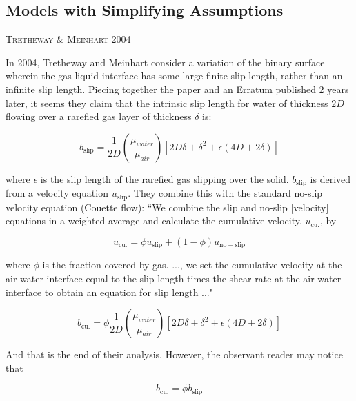 \documentclass[a4paper]{report}
\newcommand{\paper}[1]
         {\colorbox[gray]{0.8}{ \textsc{#1}}
         
         }
\begin{document}
\subsection*{Models with Simplifying Assumptions}

\paper{Tretheway \& Meinhart 2004}
In 2004, Tretheway and Meinhart \cite{TrethewayMeinhart2004} consider a variation of the binary surface wherein the gas-liquid interface has some large finite slip length, rather than an infinite slip length.  Piecing together the paper and an Erratum \cite{TrethewayMeinhartErratum2004} published 2 years later, it seems they claim that the intrinsic slip length for water of thickness $2D$ flowing over a rarefied gas layer of thickness $\delta$ is:

\begin{equation*}
b_{\mathrm{slip}} = \frac{1}{2D} \left( \frac{\mu_{water}}{\mu_{air}} \right)
\left[ 2D\delta + \delta^2 + \epsilon(4D + 2\delta) \right]
\end{equation*}

where $\epsilon$ is the slip length of the rarefied gas slipping over the solid.  $b_{\mathrm{slip}}$ is derived from a velocity equation $u_{\mathrm{slip}}$.  They combine this with the standard no-slip velocity equation (Couette flow):
``We combine the slip and no-slip [velocity] equations in a weighted average and calculate the cumulative velocity, $u_{\mathrm{cu.}}$, by

\begin{equation*}
u_{\mathrm{cu.}} = \phi u_{\mathrm{slip}} + (1-\phi) u_{\mathrm{no-slip}}
\end{equation*}

where $\phi$ is the fraction covered by gas. ..., we set the cumulative velocity at the air-water interface equal to the slip length times the shear rate at the air-water interface to obtain an equation for slip length ..."

\begin{equation*}
b_{\mathrm{cu.}} = \phi \frac{1}{2D} \left( \frac{\mu_{water}}{\mu_{air}} \right)
 \left[ 2D\delta + \delta^2 + \epsilon(4D + 2\delta) \right]
\end{equation*}

And that is the end of their analysis.  However, the observant reader may notice that

\begin{equation*}
b_{\mathrm{cu.}} = \phi b_{\mathrm{slip}} 
\end{equation*}
\end{document}
